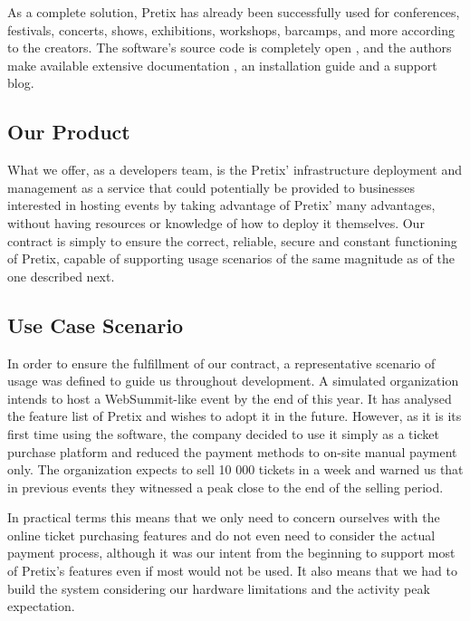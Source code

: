 \documentclass[12pt]{article}
\begin{document}
As a complete solution, Pretix has already been successfully used for conferences, festivals, concerts, shows, exhibitions, workshops, barcamps, and more 
according to the creators.
The software's source code is completely open \cite{pretixgit}, and the authors make available extensive documentation \cite{pretixdoc}, an installation 
guide and a support blog.

\subsection{Our Product} \label{pretix.product} %


What we offer, as a developers team, is the Pretix' infrastructure deployment and management as a service that could potentially be provided to businesses 
interested in hosting events by taking advantage of Pretix' many advantages, without having resources or knowledge of how to deploy it themselves.
Our contract is simply to ensure the correct, reliable, secure and constant functioning of Pretix, capable of supporting usage scenarios of the same magnitude 
as of the one described next.

\subsection{Use Case Scenario} \label{pretix.scenario} %


In order to ensure the fulfillment of our contract, a representative scenario of usage was defined to guide us throughout development.
A simulated organization intends to host a WebSummit-like event by the end of this year.
It has analysed the feature list of Pretix and wishes to adopt it in the future.
However, as it is its first time using the software, the company decided to use it simply as a ticket purchase platform and reduced the payment methods to 
on-site manual payment only. 
The organization expects to sell 10 000 tickets in a week and warned us that in previous events they witnessed a peak close to the end of the selling period.

In practical terms this means that we only need to concern ourselves with the online ticket purchasing features and do not even need to consider the actual 
payment process, although it was our intent from the beginning to support most of Pretix's features even if most would not be used.
It also means that we had to build the system considering our hardware limitations and the activity peak expectation.
\end{document}
